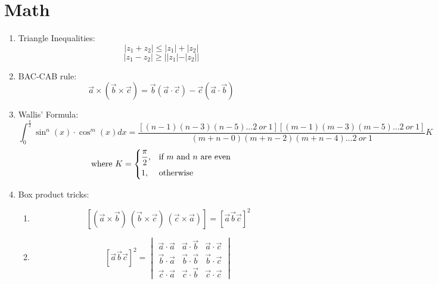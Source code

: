 \documentclass{article}
\numberwithin{equation}{section}
\numberwithin{figure}{section}
\newcommand{\Cr}{\times}
\begin{document}
\section{Math}
\begin{enumerate}
	\item Triangle Inequalities:
\begin{equation}
	|z_1+z_2|\leq|z_1|+|z_2|
\end{equation}
\begin{equation}
	|z_1-z_2|\geq ||z_1|-|z_2||
\end{equation}
	\item BAC-CAB rule:
\begin{equation}
	\vec{a}\Cr(\vec{b}\Cr\vec{c})=\vec{b}(\vec{a}\cdot\vec{c})-\vec{c}(\vec{a}\cdot\vec{b})
\end{equation}
	\item Wallis' Formula:
\begin{equation}
	\int_{0}^{\frac{\pi}{2}} \sin^{n}(x)\cdot \cos^{m}(x)dx=\frac{[(n-1)(n-3)(n-5)\dots 2\ or \ 1][(m-1)(m-3)(m-5)\dots 2 \ or \ 1 ]}{(m+n-0)(m+n-2)(m+n-4)\dots 2 \ or \ 1} K
\end{equation}
\begin{equation}
	\text{where }    K= 
	\begin{dcases}
		\frac{\pi}{2} ,& \text{if }  m \text{ and } n \text{ are even}\\
		        1,              & \text{otherwise}
	\end{dcases}
\end{equation}			
	\item Box product tricks:
		\begin{enumerate}
			\item \begin{equation}\left[(\vec{a}\Cr \vec{b}) \  (\vec{b}\Cr \vec{c}) \ (\vec{c}\Cr\vec{a})\right]=\left[\vec{a} \vec{b} \vec{c}\right]^2\end{equation}
			\item 
				\begin{equation}
					\left[\vec{a} \vec{b} \vec{c}\right]^2=
					\begin{vmatrix}
						\vec{a}\cdot\vec{a} & \vec{a}\cdot \vec{b} & \vec{a}\cdot\vec{c}\\
						\vec{b}\cdot\vec{a} & \vec{b}\cdot\vec{b} & \vec{b}\cdot\vec{c}\\
						\vec{c}\cdot\vec{a} & \vec{c}\cdot\vec{b} & \vec{c}\cdot\vec{c}
					\end{vmatrix}
				\end{equation}

\end{enumerate}
\end{enumerate}
\end{document}
